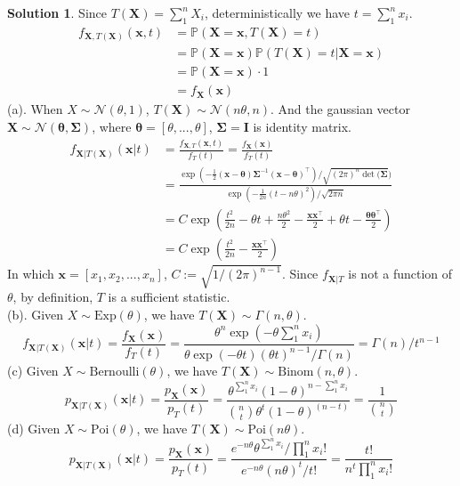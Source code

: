 \documentclass[a4paper, 10pt]{article}
\theoremstyle{definition}
\theoremstyle{hSol}
\newtheorem*{solution}{Solution}
\begin{document}
\begin{solution} Since $T(\bm{X})=\sum_1^n X_i$, deterministically we have $t=\sum_1^n x_i$.
\begin{equation}
  \begin{split}
    f_{\bm{X},T(\bm{X})}(\bm{x},t) &= \mathbb{P}\left(\bm{X}=\bm{x}, T(\bm{X})=t\right) \\
    &= \mathbb{P}\left(\bm{X}=\bm{x}\right) \mathbb{P}\left(T(\bm{X})=t|\bm{X}=\bm{x}\right) \\
    &= \mathbb{P}\left(\bm{X}=\bm{x}\right)\cdot 1 \\
    &= f_{\bm{X}}(\bm{x})
  \end{split}
\end{equation}
(a). When $X\sim \mathcal{N}(\theta, 1)$, $T(\bm{X})\sim \mathcal{N}(n\theta, n)$. And the gaussian vector $\bm{X}\sim \mathcal{N}(\bm{\theta}, \bm{\Sigma})$, where $\bm{\theta}=[\theta, ..., \theta]$, $\bm{\Sigma}=\bm{I}$ is identity matrix.
\begin{equation}
  \begin{split}
    f_{\bm{X}|T(\bm{X})}(\bm{x}|t) &= \frac{f_{\bm{X}, T}(\bm{x}, t)}{f_{T}(t)} = \frac{f_{\bm{X}}(\bm{x})}{f_{T}(t)} \\
    &= \frac{\exp\left(-\frac{1}{2}(\bm{x}-\bm{\theta})\bm{\Sigma}^{-1}(\bm{x}-\bm{\theta})^{\top}\right)/\sqrt{(2\pi)^n \det(\bm{\Sigma}})} {\exp(-\frac{1}{2n}(t-n\theta)^2)/\sqrt{2\pi n}} \\
    &= C \exp\left(\frac{t^2}{2n}-\theta t+\frac{n\theta^2}{2}-\frac{\bm{x}\bm{x}^{\top}}{2}+\theta t -\frac{\bm{\theta}\bm{\theta}^{\top}}{2}\right) \\
    &= C \exp\left(\frac{t^2}{2n} - \frac{\bm{x}\bm{x}^{\top}}{2}\right)
  \end{split}
\end{equation}
In which $\bm{x}=[x_1, x_2, ..., x_n]$, $C:=\sqrt{1/(2\pi)^{n-1}}$. Since $f_{\bm{X}|T}$ is not a function of $\theta$, by definition, $T$ is a sufficient statistic. \\
(b). Given $X\sim \text{Exp}(\theta)$, we have $T(\bm{X})\sim \Gamma(n, \theta)$.
\begin{equation}
  f_{\bm{X}|T(\bm{X})}(\bm{x}|t) = \frac{f_{\bm{X}}(\bm{x})}{f_{T}(t)} = \frac{\theta^n \exp(-\theta \sum_1^n x_i)}{\theta \exp(-\theta t)(\theta t)^{n-1}/\Gamma(n)} = \Gamma(n) / t^{n-1}
\end{equation}
(c) Given $X\sim \text{Bernoulli}(\theta)$, we have $T(\bm{X})\sim \text{Binom}(n,\theta)$.
\begin{equation}
  p_{\bm{X}|T(\bm{X})}(\bm{x}|t) = \frac{p_{\bm{X}}(\bm{x})}{p_{T}(t)} = \frac{\theta^{\sum_1^n x_i}(1-\theta)^{n-\sum_{1}^n x_i}}{\binom{n}{t}\theta^t(1-\theta)^{(n-t)}} = \frac{1}{\binom{n}{t}}
\end{equation}
(d) Given $X\sim \text{Poi}(\theta)$, we have $T(\bm{X})\sim \text{Poi}(n\theta)$.
\begin{equation}
  p_{\bm{X}|T(\bm{X})}(\bm{x}|t) = \frac{p_{\bm{X}}(\bm{x})}{p_{T}(t)} = \frac{e^{-n\theta}\theta^{\sum_1^n x_i}/\prod_1^n x_i!}{e^{-n\theta}(n\theta)^t/t!} = \frac{t!}{n^t \prod_1^n x_i!}
\end{equation}
\end{solution}
\end{document}
